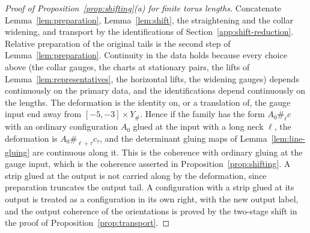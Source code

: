 \documentclass[11pt]{amsart}
\theoremstyle{definition}
\theoremstyle{remark}
\theoremstyle{plain}
\numberwithin{equation}{section}
\begin{document}
\begin{proof}[Proof of Proposition~\ref{prop:shifting}(a) for finite torus lengths]
Concatenate Lemma~\ref{lem:preparation}, Lemma~\ref{lem:shift}, the
straightening and the collar widening, and transport by the identifications of
Section~\ref{app:shift-reduction}. Relative preparation of the original
tails is the second step of Lemma~\ref{lem:preparation}. Continuity in the
data holds because every choice above (the collar gauges, the charts at
stationary pairs, the lifts of Lemma~\ref{lem:representatives}, the horizontal
lifts, the widening gauges) depends continuously on the primary data, and
the identifications depend continuously on the lengths. The deformation is
the identity on, or a translation of, the gauge input end away from
$[-5,-3]\times Y_\#$. Hence if
the family has the form $A_0\#_\ell c$ with an ordinary configuration $A_0$
glued at the input with a long neck $\ell$, the deformation is
$A_0\#_{\ell+\tau}c_\tau$, and the determinant gluing maps of
Lemma~\ref{lem:line-gluing} are continuous along it. This is the coherence with
ordinary gluing at the gauge input, which is the coherence asserted in
Proposition~\ref{prop:shifting}. A strip glued at the output is not
carried along by the deformation, since preparation truncates the output
tail. A configuration with a strip glued at its output is treated as a
configuration in its own right, with the new output label, and the
output coherence of the orientations is proved by the two-stage shift in
the proof of Proposition~\ref{prop:transport}.
\end{proof}
\end{document}
